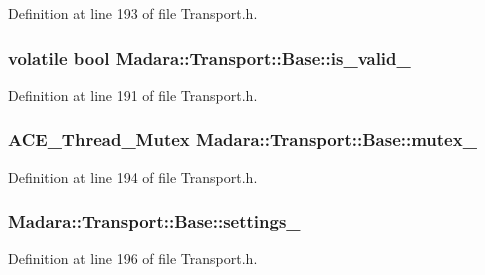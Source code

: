 Definition at line 193 of file Transport.h.

\hypertarget{classMadara_1_1Transport_1_1Base_a77696ae1c39c0d0edc169882c4b82c23}{
\subsubsection[{is\_\-valid\_\-}]{\setlength{\rightskip}{0pt plus 5cm}volatile bool {\bf Madara::Transport::Base::is\_\-valid\_\-}}}
\label{dc/d97/classMadara_1_1Transport_1_1Base_a77696ae1c39c0d0edc169882c4b82c23}


Definition at line 191 of file Transport.h.

\hypertarget{classMadara_1_1Transport_1_1Base_a81479f3b01798d0836dc44629c904450}{
\subsubsection[{mutex\_\-}]{\setlength{\rightskip}{0pt plus 5cm}ACE\_\-Thread\_\-Mutex {\bf Madara::Transport::Base::mutex\_\-}}}
\label{dc/d97/classMadara_1_1Transport_1_1Base_a81479f3b01798d0836dc44629c904450}


Definition at line 194 of file Transport.h.

\hypertarget{classMadara_1_1Transport_1_1Base_adafa1a5641aaecae76d963748bddf8e2}{
\subsubsection[{settings\_\-}]{ {\bf Madara::Transport::Base::settings\_\-}}}
\label{dc/d97/classMadara_1_1Transport_1_1Base_adafa1a5641aaecae76d963748bddf8e2}


Definition at line 196 of file Transport.h.

